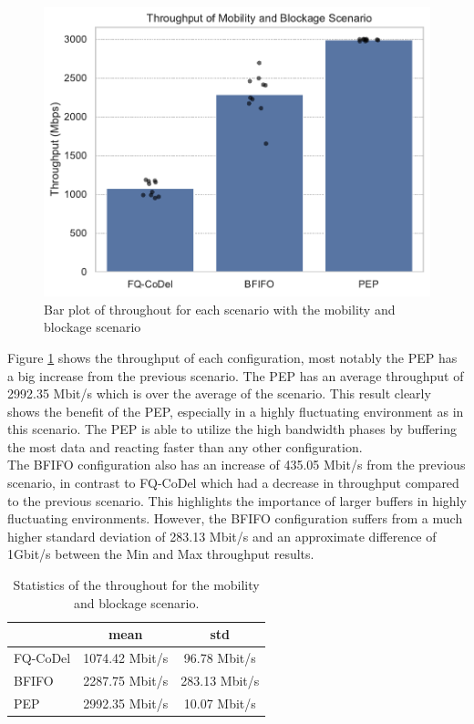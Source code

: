 \documentclass[a4paper,english, 11pt]{report}
\begin{document}
\begin{figure}[!h!] %
	\centering
	\includegraphics[scale=0.70]{../diagrams/witestlab/throughput/throughput_mobb.pdf}
  	\caption{Bar plot of throughout for each scenario with the mobility and blockage scenario}
  	\label{fig:throughput_mobb}
\end{figure}

Figure \ref{fig:throughput_mobb} shows the throughput of each configuration, most notably the PEP has a big increase from the previous scenario. The PEP has an average throughput of 2992.35 Mbit/s which is over the average of the scenario. This result clearly shows the benefit of the PEP, especially in a highly fluctuating environment as in this scenario. The PEP is able to utilize the high bandwidth phases by buffering the most data and reacting faster than any other configuration.\\

The BFIFO configuration also has an increase of 435.05 Mbit/s from the previous scenario, in contrast to FQ-CoDel which had a decrease in throughput compared to the previous scenario. This highlights the importance of larger buffers in highly fluctuating environments. However, the BFIFO configuration suffers from a much higher standard deviation of 283.13 Mbit/s and an approximate difference of 1Gbit/s between the Min and Max throughput results.\\

\begin{table}[h!]
\centering
\begin{tabular}{l|c|c}
\hline
 & \textbf{mean} & \textbf{std}  \\ 
\hline
FQ-CoDel & 1074.42 Mbit/s      & 96.78 Mbit/s     \\
BFIFO    & 2287.75 Mbit/s      & 283.13 Mbit/s   \\
PEP      & 2992.35 Mbit/s      & 10.07 Mbit/s    \\
\hline
\end{tabular}
\caption{Statistics of the throughout for the mobility and blockage scenario.}
\label{tab:throughput_mobb_table}
\end{table}
\end{document}
